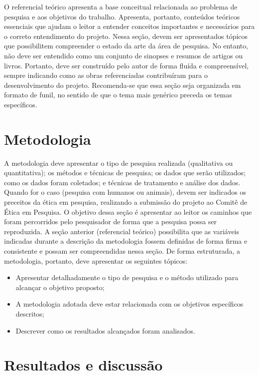 \documentclass[
	article,			%
	11pt,				%
	oneside,			%
	a4paper,			%
	english,			%
	brazil,				%
	sumario=tradicional
	]{abntex2}
\begin{document}
O referencial teórico apresenta a base conceitual relacionada ao problema de pesquisa e aos objetivos do trabalho. Apresenta, portanto, conteúdos teóricos essenciais que ajudam o leitor a entender conceitos importantes e necessários para o correto entendimento do projeto.
Nessa seção, devem ser apresentados tópicos que possibilitem compreender o estado da arte da área de pesquisa. No entanto, não deve ser entendido como um conjunto de sinopses e resumos de artigos ou livros. Portanto, deve ser construído pelo autor de forma fluída e compreensível, sempre indicando como as obras referenciadas contribuíram para o desenvolvimento do projeto. 
Recomenda-se que essa seção seja organizada em formato de funil, no sentido de que o tema mais genérico preceda os temas específicos.


\section{Metodologia}

A metodologia deve apresentar o tipo de pesquisa realizada (qualitativa ou quantitativa); os métodos e técnicas de pesquisa; os dados que serão utilizados; como os dados foram coletados; e técnicas de tratamento e análise dos dados. Quando for o caso (pesquisa com humanos ou animais), devem ser indicados os preceitos da ética em pesquisa, realizando a submissão do projeto ao Comitê de Ética em Pesquisa.
O objetivo dessa seção é apresentar ao leitor os caminhos que foram percorridos pelo pesquisador de forma que a pesquisa possa ser reproduzida. A seção anterior (referencial teórico) possibilita que as variáveis indicadas durante a descrição da metodologia fossem definidas de forma firma e consistente e possam ser compreendidas nessa seção.
De forma estruturada, a metodologia, portanto, deve apresentar os seguintes tópicos:

\begin{itemize}
\item Apresentar detalhadamente o tipo de pesquisa e o método utilizado para alcançar o objetivo proposto;
\item A metodologia adotada deve estar relacionada com os objetivos específicos descritos;
\item Descrever como os resultados alcançados foram analisados.
\end{itemize}


\section{Resultados e discussão}
\end{document}
